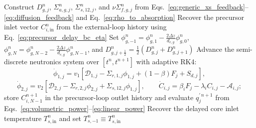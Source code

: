 \documentclass[a4paper,12pt]{article}
\begin{document}
\begin{algorithm}[t]
\DontPrintSemicolon
\SetAlgoLined
\small
\caption{Core finite-difference update over one outer step}
\label{alg:fdtd_core_msre_bc}
Construct \(D_{g,j}^n\), \(\Sigma_{a,g,j}^n\), \(\Sigma_{s,12,j}^n\), and
\(\nu\Sigma_{f,g,j}^n\) from
Eqs.~\eqref{eq:generic_xs_feedback}--\eqref{eq:diffusion_feedback} and
Eq.~\eqref{eq:rho_to_absorption}\;
Recover the precursor inlet vector \(C_{i,\mathrm{in}}^n\) from the
external-loop history using Eq.~\eqref{eq:precursor_delay_bc_eta}\;
Set \(\phi_{g,-1}^n=\phi_{g,1}^n-\frac{2\Delta z}{d_{e,g}}\phi_{g,0}^n\),
\(\phi_{g,N}^n=\phi_{g,N-2}^n-\frac{2\Delta z}{d_{e,g}}\phi_{g,N-1}^n\),
and \(D_{g,j+\frac12}^n=\frac12\left(D_{g,j}^n+D_{g,j+1}^n\right)\)\;
Advance the semi-discrete neutronics system over \([t^n,t^{n+1}]\) with
adaptive RK4:
\[
\dot{\phi}_{1,j}=v_1\left[\mathcal{D}_{1,j}-\Sigma_{r,1,j}\phi_{1,j}+(1-\beta)F_j+S_{d,j}\right],
\]
\[
\dot{\phi}_{2,j}=v_2\left[\mathcal{D}_{2,j}-\Sigma_{r,2,j}\phi_{2,j}+\Sigma_{s,12,j}\phi_{1,j}\right],
\qquad
\dot{C}_{i,j}=\beta_i F_j-\lambda_i C_{i,j}-\mathcal{A}_{i,j};
\]
store \(C_{i,N-1}^{n+1}\) in the precursor-loop outlet history and
evaluate \(q_j^{\prime\,n+1}\) from
Eqs.~\eqref{eq:volumetric_power}--\eqref{eq:linear_power}\;
Recover the delayed core inlet temperature \(T_{s,\mathrm{in}}^n\) and
set \(T_{s,-1}^n\equiv T_{s,\mathrm{in}}^n\)\;
\end{algorithm}
\end{document}
